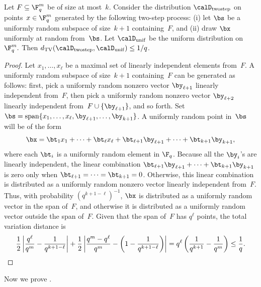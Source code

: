 \begin{proposition}\label{prop:almost-uniform}
Let $F \subseteq \F_q^m$ be of size at most~$k$. Consider the distribution $\calD_{\mathrm{twostep}}$ on points~$x\in\F_q^m$ generated by the following two-step process:
(i) let $\bs$ be a uniformly random subspace of size~$k+1$ containing~$F$, and (ii) draw $\bx$ uniformly at random from~$\bs$.
Let $\calD_{\mathrm{unif}}$ be the uniform distribution on~$\F_q^m.$
Then $d_\mathrm{TV}(\calD_{\mathrm{twostep}}, \calD_{\mathrm{unif}}) \leq 1/q$.
\end{proposition}
\begin{proof}
Let $x_1, \ldots, x_\ell$ be a maximal set of linearly independent elements from~$F$.
A uniformly random subspace of size~$k+1$ containing~$F$ can be generated as follows:
first, pick a uniformly random nonzero vector $\by_{\ell+1}$ linearly independent from~$F$,
then pick a uniformly random nonzero vector $\by_{\ell+2}$ linearly independent from~$F\cup\{\by_{\ell+1}\}$,
and so forth. Set $\bs = \mathrm{span}\{x_1, \ldots, x_\ell, \by_{\ell+1}, \ldots, \by_{k+1}\}$.
A uniformly random point in~$\bs$ will be of the form 
\begin{equation*}
\bx = \bt_1 x_1 + \cdots + \bt_\ell x_\ell + \bt_{\ell+1} \by_{\ell+1} + \cdots + \bt_{k+1} \by_{k+1},
\end{equation*}
where each $\bt_{i}$ is a uniformly random element in $\F_q$.
Because all the $\by_i$'s are linearly independent,
the linear combination $\bt_{\ell+1} \by_{\ell+1} + \cdots + \bt_{k+1} \by_{k+1}$
is zero only when $\bt_{\ell+1} = \cdots = \bt_{k+1} = 0$.
Otherwise, this linear combination is distributed as a uniformly random nonzero vector linearly independent from~$F$.
Thus, with probability $(q^{k+1-\ell})^{-1}$, $\bx$ is distributed as a uniformly random vector in the span of~$F$,
and otherwise it is distributed as a uniformly random vector outside the span of~$F$.
Given that the span of~$F$ has $q^{\ell}$ points, the total variation distance is
\begin{equation*}
\frac{1}{2} \left| \frac{q^{\ell}}{q^m} - \frac{1}{q^{k+1-\ell}}\right|
+ \frac{1}{2} \left| \frac{q^m- q^{\ell}}{q^m} - \left(1- \frac{1}{q^{k+1-\ell}}\right)\right|
= q^{\ell}\left(\frac{1}{q^{k+1}} - \frac{1}{q^m}\right)
\leq \frac{1}{q}.\qedhere
\end{equation*}
\end{proof}

Now we prove .

